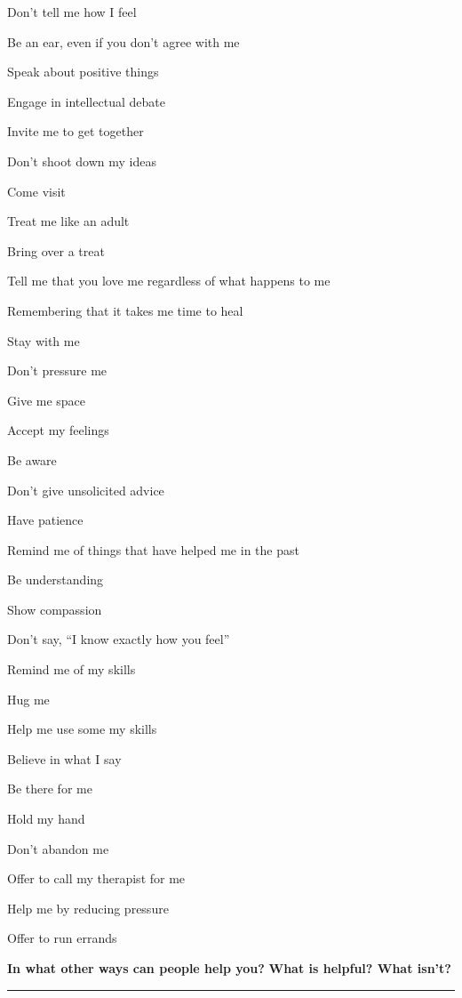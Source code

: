 \begin{multicols}{2}
\begin{checkboxlist}
\item Don’t tell me how I feel
\item Be an ear, even if you don’t agree with me
\item Speak about positive things
\item Engage in intellectual debate
\item Invite me to get together
\item Don’t shoot down my ideas
\item Come visit
\item Treat me like an adult
\item Bring over a treat
\item Tell me that you love me regardless of what happens to me
\item Remembering that it takes me time to heal
\item Stay with me
\item Don’t pressure me
\item Give me space
\item Accept my feelings
\item Be aware
\item Don’t give unsolicited advice
\item Have patience
\item Remind me of things that have helped me in the past
\item Be understanding
\item Show compassion
\item Don’t say, “I know exactly how you feel”
\item Remind me of my skills
\item Hug me
\item Help me use some my skills
\item Believe in what I say
\item Be there for me
\item Hold my hand
\item Don’t abandon me
\item Offer to call my therapist for me
\item Help me by reducing pressure
\item Offer to run errands
\end{checkboxlist}
\end{multicols}
\noindent\textcolor{ProcessBlue}{\textbf{\Large{In what other ways can people help you?}}}
\noindent\textcolor{ProcessBlue}{\textbf{\Large{What is helpful? What isn’t?}}}\\
\noindent\rule{\textwidth}{1pt}\\
